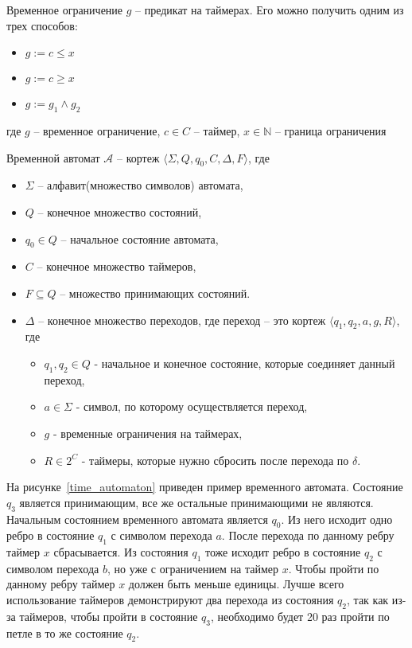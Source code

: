 \documentclass[times,specification,annotation]{itmo-student-thesis}
\begin{document}
\begin{definition}
  Временное ограничение $g$ -- предикат на таймерах. Его можно получить одним из трех способов:
  \begin{itemize}
    \item $g := c \leq x$
    \item $g := c \geq x$
    \item $g := g_1 \land g_2$
  \end{itemize}
  где $g$ -- временное ограничение, $c \in C$ -- таймер, $x \in \mathbb{N}$ -- граница ограничения
\end{definition}

\begin{definition}
  Временной автомат $\mathcal{A}$ -- кортеж $\langle \Sigma, Q, q_0, C, \Delta, F \rangle$, где
  \begin{itemize}
    \item $\Sigma$ -- алфавит(множество символов) автомата,
    \item $Q$ -- конечное множество состояний,
    \item $q_0 \in Q$ -- начальное состояние автомата,
    \item $C$ -- конечное множество таймеров,
    \item $F \subseteq Q$ -- множество принимающих состояний.
    \item $\Delta$ -- конечное множество переходов, где переход -- это кортеж $\langle q_1, q_2, a, g, R \rangle$, где
    \begin{itemize}
      \item $q_1, q_2 \in Q$ - начальное и конечное состояние, которые соединяет данный переход,
      \item $a \in \Sigma$ - символ, по которому осуществляется переход,
      \item $g$ - временные ограничения на таймерах,
      \item $R \in 2^{C}$ - таймеры, которые нужно сбросить после перехода по $\delta$. 
    \end{itemize}
  \end{itemize}
\end{definition}

\begin{example}
  На рисунке~\ref{time_automaton} приведен пример временного автомата. 
  Состояние $q_3$ является принимающим, все же остальные принимающими не являются. 
  Начальным состоянием временного автомата является $q_0$. 
  Из него исходит одно ребро в состояние $q_1$ с символом перехода $a$. 
  После перехода по данному ребру таймер $x$ сбрасывается. 
  Из состояния $q_1$ тоже исходит ребро в состояние $q_2$ с символом перехода $b$, но уже с ограничением на таймер $x$.
  Чтобы пройти по данному ребру таймер $x$ должен быть меньше единицы.
  Лучше всего использование таймеров демонстрируют два перехода из состояния $q_2$, так как из-за таймеров, чтобы пройти в состояние $q_3$, необходимо будет 20 раз пройти по петле в то же состояние $q_2$.
\end{example}
\end{document}
